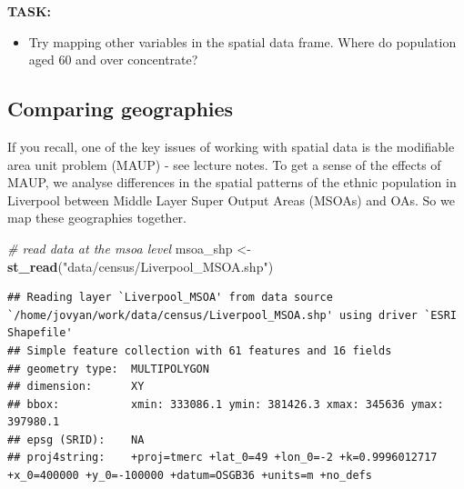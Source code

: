 \documentclass[]{book}
\newenvironment{Shaded}{\begin{snugshade}}{\end{snugshade}}
\newcommand{\CommentTok}[1]{\textcolor[rgb]{0.56,0.35,0.01}{\textit{#1}}}
\newcommand{\KeywordTok}[1]{\textcolor[rgb]{0.13,0.29,0.53}{\textbf{#1}}}
\newcommand{\NormalTok}[1]{#1}
\newcommand{\StringTok}[1]{\textcolor[rgb]{0.31,0.60,0.02}{#1}}
\providecommand{\tightlist}{%
  \setlength{\itemsep}{0pt}\setlength{\parskip}{0pt}}
\begin{document}
\textbf{TASK:}

\begin{itemize}
\tightlist
\item
  Try mapping other variables in the spatial data frame. Where do population aged 60 and over concentrate?
\end{itemize}

\hypertarget{comparing-geographies}{%
\subsection{Comparing geographies}\label{comparing-geographies}}

If you recall, one of the key issues of working with spatial data is the modifiable area unit problem (MAUP) - see lecture notes. To get a sense of the effects of MAUP, we analyse differences in the spatial patterns of the ethnic population in Liverpool between Middle Layer Super Output Areas (MSOAs) and OAs. So we map these geographies together.

\begin{Shaded}
\begin{Highlighting}[]
\CommentTok{# read data at the msoa level}
\NormalTok{msoa_shp <-}\StringTok{ }\KeywordTok{st_read}\NormalTok{(}\StringTok{"data/census/Liverpool_MSOA.shp"}\NormalTok{)}
\end{Highlighting}
\end{Shaded}

\begin{verbatim}
## Reading layer `Liverpool_MSOA' from data source `/home/jovyan/work/data/census/Liverpool_MSOA.shp' using driver `ESRI Shapefile'
## Simple feature collection with 61 features and 16 fields
## geometry type:  MULTIPOLYGON
## dimension:      XY
## bbox:           xmin: 333086.1 ymin: 381426.3 xmax: 345636 ymax: 397980.1
## epsg (SRID):    NA
## proj4string:    +proj=tmerc +lat_0=49 +lon_0=-2 +k=0.9996012717 +x_0=400000 +y_0=-100000 +datum=OSGB36 +units=m +no_defs
\end{verbatim}
\end{document}
